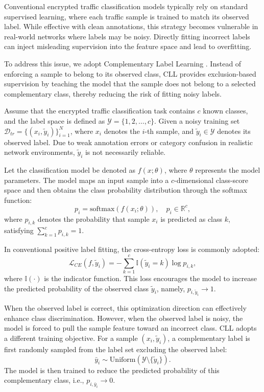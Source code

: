 \documentclass{SCIS2026}
\begin{document}
Conventional encrypted traffic classification models typically rely on standard supervised learning, where each traffic sample is trained to match its observed label. While effective with clean annotations, this strategy becomes vulnerable in real-world networks where labels may be noisy. Directly fitting incorrect labels can inject misleading supervision into the feature space and lead to overfitting.

To address this issue, we adopt Complementary Label Learning \cite{CLL-1, CLL-2, CLL-3}. Instead of enforcing a sample to belong to its observed class, CLL provides exclusion-based supervision by teaching the model that the sample does not belong to a selected complementary class, thereby reducing the risk of fitting noisy labels.

Assume that the encrypted traffic classification task contains $c$ known classes, and the label space is defined as $\mathcal{Y}=\{1,2,\ldots,c\}$. Given a noisy training set $\mathcal{D}_{tr}=\{(x_i,\tilde{y}_i)\}_{i=1}^{N}$, where $x_i$ denotes the $i$-th sample, and $\tilde{y}_i \in \mathcal{Y}$ denotes its observed label. Due to weak annotation errors or category confusion in realistic network environments, $\tilde{y}_i$ is not necessarily reliable.

Let the classification model be denoted as $f(x;\theta)$, where $\theta$ represents the model parameters. The model maps an input sample into a $c$-dimensional class-score space and then obtains the class probability distribution through the softmax function:
\begin{equation}
	p_i=\mathrm{softmax}(f(x_i;\theta)), \quad p_i \in \mathbb{R}^{c},
\end{equation}
where $p_{i,k}$ denotes the probability that sample $x_i$ is predicted as class $k$, satisfying $\sum_{k=1}^{c} p_{i,k}=1$.

In conventional positive label fitting, the cross-entropy loss is commonly adopted:
\begin{equation}
	\mathcal{L}_{CE}(f,\tilde{y}_i)
	=
	-\sum_{k=1}^{c}\mathbb{I}(\tilde{y}_i=k)\log p_{i,k},
	\label{eq:CE_loss}
\end{equation}
where $\mathbb{I}(\cdot)$ is the indicator function. This loss encourages the model to increase the predicted probability of the observed class $\tilde{y}_i$, namely, $p_{i,\tilde{y}_i} \rightarrow 1$.

When the observed label is correct, this optimization direction can effectively enhance class discrimination. However, when the observed label is noisy, the model is forced to pull the sample feature toward an incorrect class. CLL adopts a different training objective. For a sample $(x_i,\tilde{y}_i)$, a complementary label is first randomly sampled from the label set excluding the observed label:
\begin{equation}
	\bar{y}_i \sim \mathrm{Uniform}(\mathcal{Y}\setminus\{\tilde{y}_i\}).
\end{equation}
The model is then trained to reduce the predicted probability of this complementary class, i.e., $p_{i,\bar{y}_i} \rightarrow 0$.
\end{document}
